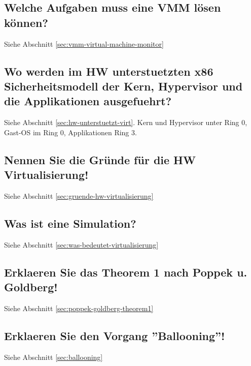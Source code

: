 \subsection{Welche Aufgaben muss eine VMM lösen können?}
Siehe Abschnitt \ref{sec:vmm-virtual-machine-monitor}

\subsection{Wo werden im HW unterstuetzten x86 Sicherheitsmodell der Kern, Hypervisor und die Applikationen ausgefuehrt?}
Siehe Abschnitt \ref{sec:hw-unterstuetzt-virt}. Kern und Hypervisor unter Ring 0, Gast-OS im Ring 0, Applikationen Ring 3.

\subsection{Nennen Sie die Gründe für die HW Virtualisierung!}
Siehe Abschnitt \ref{sec:gruende-hw-virtualisierung}

\subsection{Was ist eine Simulation?}
Siehe Abschnitt \ref{sec:was-bedeutet-virtualisierung}

\subsection{Erklaeren Sie das Theorem 1 nach Poppek u. Goldberg!}
Siehe Abschnitt \ref{sec:poppek-goldberg-theorem1}

\subsection{Erklaeren Sie den Vorgang ''Ballooning''!}
Siehe Abschnitt \ref{sec:ballooning}